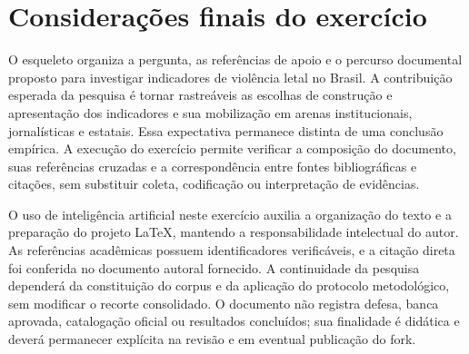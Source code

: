 \section{Considerações finais do exercício}

O esqueleto organiza a pergunta, as referências de apoio e o percurso documental proposto para investigar indicadores de violência letal no Brasil. A contribuição esperada da pesquisa é tornar rastreáveis as escolhas de construção e apresentação dos indicadores e sua mobilização em arenas institucionais, jornalísticas e estatais. Essa expectativa permanece distinta de uma conclusão empírica. A execução do exercício permite verificar a composição do documento, suas referências cruzadas e a correspondência entre fontes bibliográficas e citações, sem substituir coleta, codificação ou interpretação de evidências.

O uso de inteligência artificial neste exercício auxilia a organização do texto e a preparação do projeto LaTeX, mantendo a responsabilidade intelectual do autor. As referências acadêmicas possuem identificadores verificáveis, e a citação direta foi conferida no documento autoral fornecido. A continuidade da pesquisa dependerá da constituição do corpus e da aplicação do protocolo metodológico, sem modificar o recorte consolidado. O documento não registra defesa, banca aprovada, catalogação oficial ou resultados concluídos; sua finalidade é didática e deverá permanecer explícita na revisão e em eventual publicação do fork.

